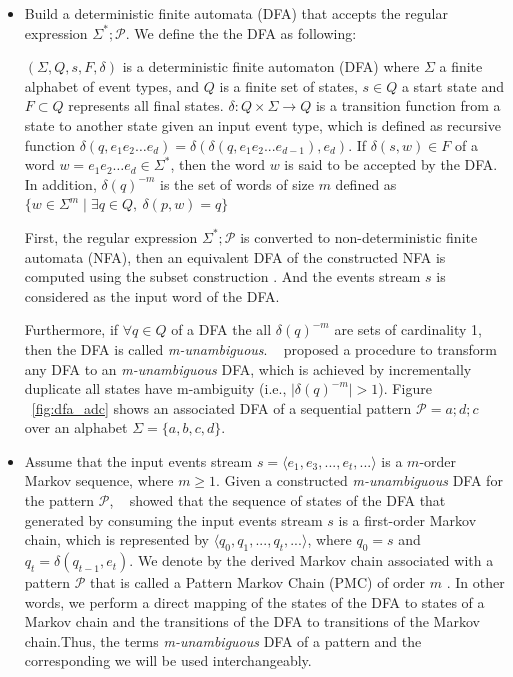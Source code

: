 \begin{itemize}[noitemsep]
	\item Build a deterministic finite automata (DFA) that accepts the regular expression $\Sigma^{*};\mathcal{P}$. We define the the DFA as following:
	
	\begin{definition}
	 $(\Sigma,Q,s,F,\delta)$ is a deterministic finite automaton (DFA)  where  $\Sigma$ a finite alphabet of event types, and $Q$ is a finite set of states, $s \in Q$ a start state and $F \subset Q$ represents all final states. $\delta: Q \times \Sigma \rightarrow Q$ is a transition function from a state to another state given an input event type, which is defined as recursive function $\delta(q,e_{1}e_{2}\ldots e_{d})=\delta(\delta(q,e_{1}e_{2}...e_{d-1}),e_{d})$. If $\delta(s,w) \in F$ of a word $w=e_{1}e_{2}\ldots e_{d} \in \Sigma^{*}$, then the word $w$ is said to be accepted by the DFA. In addition,  $\delta(q)^{-m}$ is the set of words of size $m$ defined as $\{w \in \Sigma^{m} \mid \exists q \in Q,\ \delta(p,w)=q \}$
\end{definition}
	
	First, the regular expression $\Sigma^{*};\mathcal{P}$ is converted to non-deterministic finite automata (NFA), then an equivalent DFA of the constructed NFA is computed using the subset construction \cite{hopcroft2006automata,alevizos2017event}. And the events stream $s$ is considered as the input word of the DFA. 

Furthermore, if $\forall q \in Q$ of a DFA the all $\delta(q)^{-m}$ are sets of cardinality 1, then the DFA is called \textit{m-unambiguous}. ~\citet{nuel_pattern_2008} proposed a procedure to transform any DFA to an \textit{m-unambiguous} DFA, which is achieved by incrementally duplicate all states have m-ambiguity (i.e., $\vert\delta(q)^{-m}\vert > 1$).   Figure ~\ref{fig:dfa_adc} shows an associated DFA of a sequential pattern $\mathcal{P}=a ; d ; c$ over an alphabet $\Sigma=\{a,b,c,d\}$. 





\item Assume that the input events stream $s=\langle e_1,e_3,...,e_t,...\rangle$ is a $m$-order Markov sequence, where $m \geq 1$.  Given a constructed \textit{m-unambiguous} DFA for the pattern $\mathcal{P}$, ~\citet{nuel_pattern_2008} showed that the sequence of states of the DFA that generated by consuming the input events stream $s$ is a first-order Markov chain, which is represented by $\langle q_{0},q_{1},...,q_{t},...\rangle$, where $q_{0}=s$ and $q_{t}=\delta(q_{t-1},e_{t})$. We denote by \pmcmr  the derived Markov chain associated with a pattern $\mathcal{P}$ that is called a Pattern Markov Chain (PMC) of order $m$ \cite{nuel_pattern_2008}. In other words, we perform a direct mapping of the states of the DFA to states of a Markov chain and the transitions of the DFA to transitions of the Markov chain.Thus, the terms \textit{m-unambiguous} DFA of a pattern and the corresponding \pmcmr  we will be used interchangeably. 


\end{itemize}
